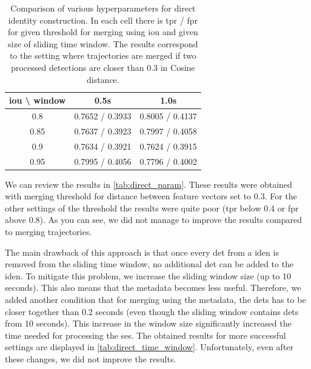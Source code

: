 \begin{table}[]
    \centering
    \begin{tabular}{c||c|c}
     \gls{iou} \textbackslash{} window & 0.5s & 1.0s \\ \hline \hline
     0.8 & 0.7652 / 0.3933 & 0.8005 / 0.4137 \\ \hline
     0.85 & 0.7637 / 0.3923 & 0.7997 / 0.4058 \\ \hline
     0.9 & 0.7634 / 0.3921 & 0.7624 / 0.3915 \\ \hline
     0.95 & 0.7995 / 0.4056 & 0.7796 / 0.4002 
    \end{tabular}
    \caption[Comparison of various hyperparameters for direct identity construction]{Comparison of various hyperparameters for direct identity construction. In each cell there is \gls{tpr} / \gls{fpr} for given threshold for merging using \gls{iou} and given size of sliding time window. The results correspond to the setting where trajectories are merged if two processed detections are closer than 0.3 in Cosine distance.}
    \label{tab:direct_param}
\end{table}

We can review the results in \autoref{tab:direct_param}. These results were obtained with merging threshold for distance between feature vectors set to 0.3. For the other settings of the threshold the results were quite poor (\gls{tpr} below 0.4 or \gls{fpr} above 0.8). As you can see, we did not manage to improve the results compared to merging trajectories.

The main drawback of this approach is that once every \gls{det} from a \gls{iden} is removed from the sliding time window, no additional \gls{det} can be added to the \gls{iden}. To mitigate this problem, we increase the sliding window size (up to 10 seconds). This also means that the metadata becomes less useful. Therefore, we added another condition that for merging using the metadata, the \glspl{det} has to be closer together than 0.2 seconds (even though the sliding window contains \glspl{det} from 10 seconds). This increase in the window size significantly increased the time needed for processing the \gls{ses}. The obtained results for more successful settings are displayed in \autoref{tab:direct_time_window}. Unfortunately, even after these changes, we did not improve the results.

